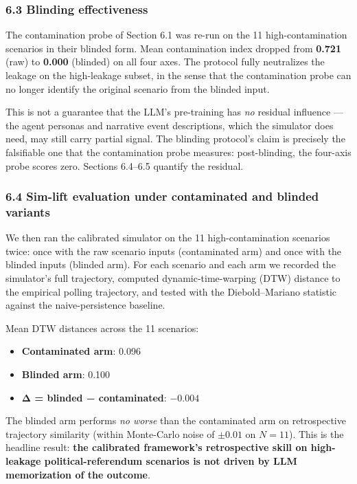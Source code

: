 \documentclass[
]{article}
\providecommand{\tightlist}{%
  \setlength{\itemsep}{0pt}\setlength{\parskip}{0pt}}
\begin{document}
\subsubsection{6.3 Blinding effectiveness}\label{blinding-effectiveness}

The contamination probe of Section 6.1 was re-run on the 11
high-contamination scenarios in their blinded form. Mean contamination
index dropped from \textbf{0.721} (raw) to \textbf{0.000} (blinded) on
all four axes. The protocol fully neutralizes the leakage on the
high-leakage subset, in the sense that the contamination probe can no
longer identify the original scenario from the blinded input.

This is not a guarantee that the LLM's pre-training has \emph{no}
residual influence --- the agent personas and narrative event
descriptions, which the simulator does need, may still carry partial
signal. The blinding protocol's claim is precisely the falsifiable one
that the contamination probe measures: post-blinding, the four-axis
probe scores zero. Sections 6.4--6.5 quantify the residual.

\subsubsection{6.4 Sim-lift evaluation under contaminated and blinded
variants}\label{sim-lift-evaluation-under-contaminated-and-blinded-variants}

We then ran the calibrated simulator on the 11 high-contamination
scenarios twice: once with the raw scenario inputs (contaminated arm)
and once with the blinded inputs (blinded arm). For each scenario and
each arm we recorded the simulator's full trajectory, computed
dynamic-time-warping (DTW) distance to the empirical polling trajectory,
and tested with the Diebold--Mariano statistic against the
naive-persistence baseline.

Mean DTW distances across the 11 scenarios:

\begin{itemize}
\tightlist
\item
  \textbf{Contaminated arm}: 0.096
\item
  \textbf{Blinded arm}: 0.100
\item
  \textbf{Δ = blinded − contaminated}: \(-0.004\)
\end{itemize}

The blinded arm performs \emph{no worse} than the contaminated arm on
retrospective trajectory similarity (within Monte-Carlo noise of
\(\pm 0.01\) on \(N = 11\)). This is the headline result: \textbf{the
calibrated framework's retrospective skill on high-leakage
political-referendum scenarios is not driven by LLM memorization of the
outcome}.
\end{document}
